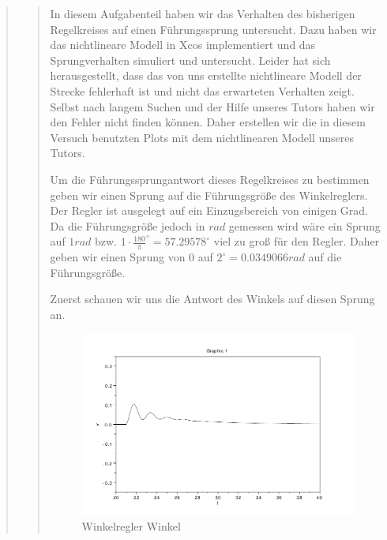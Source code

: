 \begin{quote}
    \begin{quote}
        In diesem Aufgabenteil haben wir das Verhalten des bisherigen Regelkreises auf einen Führungssprung untersucht.
        Dazu haben wir das nichtlineare Modell in Xcos implementiert und das Sprungverhalten simuliert und untersucht. Leider hat
        sich herausgestellt, dass das von uns erstellte nichtlineare Modell der Strecke fehlerhaft ist und nicht das erwarteten
        Verhalten zeigt. Selbst nach langem Suchen und der Hilfe unseres Tutors haben wir den Fehler nicht finden können. Daher
        erstellen wir die in diesem Versuch benutzten Plots mit dem nichtlinearen Modell unseres Tutors.\vspace{1em}
        
        
        Um die Führungssprungantwort dieses Regelkreises zu bestimmen geben wir einen Sprung auf die Führungsgröße des
        Winkelreglers. Der Regler ist ausgelegt auf ein Einzugsbereich von einigen Grad. Da die Führungsgröße jedoch in
        $rad$ gemessen wird wäre ein Sprung auf $1 rad$ bzw. $1\cdot \frac{180}{\pi} ^{\circ}= 57.29578^{\circ}$ viel zu
        groß für den Regler. Daher geben wir einen Sprung von $0$ auf $2^{\circ} = 0.0349066 rad$ auf die
        Führungsgröße.\vspace{1em}
        
        Zuerst schauen wir uns die Antwort des Winkels auf diesen Sprung an.
        
        \begin{figure}[H]
        \centering
            \includegraphics[scale=0.7, trim = 0cm 0cm 0cm 0cm, clip]{./Bilder/Winkelregler_Winkel}
                \caption{Winkelregler Winkel}
        \end{figure}
        

\end{quote}
\end{quote}
